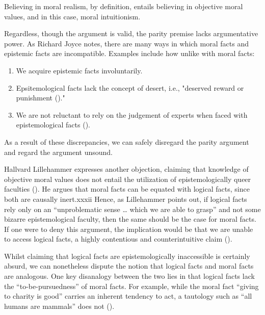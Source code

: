 \documentclass[12pt, a4paper, twoside]{article}
\begin{document}
Believing in moral realism, by definition, entails believing in objective moral values, and in this case, moral intuitionism. 

Regardless, though the argument is valid, the parity premise lacks argumentative power. As Richard Joyce notes, there are many ways in which moral facts and epistemic facts are incompatible. Examples include how unlike with moral facts: 

\begin{enumerate}

	\item We acquire epistemic facts involuntarily.

	\item Epsitemological facts lack the concept of desert, i.e., "deserved reward or punishment (\cite{merriam2024desert})."

	\item We are not reluctant to rely on the judgement of experts when faced with epistemological facts (\cite[pp.\ 14–16]{joyce2007evolution}).

\end{enumerate}

As a result of these discrepancies, we can safely disregard the parity argument and regard the argument unsound.  

Hallvard Lillehammer expresses another objection, claiming that knowledge of objective moral values does not entail the utilization of epistemologically queer faculties (\cite{balaguer2016platonism}). He argues that moral facts can be equated with logical facts, since both are causally inert.xxxii Hence, as Lillehammer points out, if logical facts rely only on an “unproblematic sense … which we are able to grasp” and not some bizarre epistemological faculty, then the same should be the case for moral facts. If one were to deny this argument, the implication would be that we are unable to access logical facts, a highly contentious and counterintuitive claim (\cite[p.\ 6]{lillehammer2019queerness}). 

Whilst claiming that logical facts are epistemologically inaccessible is certainly absurd, we can nonetheless dispute the notion that logical facts and moral facts are analogous. One key disanalogy between the two lies in that logical facts lack the “to-be-pursuedness” of moral facts. For example, while the moral fact “giving to charity is good” carries an inherent tendency to act, a tautology such as “all humans are mammals” does not (\cite{britannica2024tautology}). 
\end{document}
